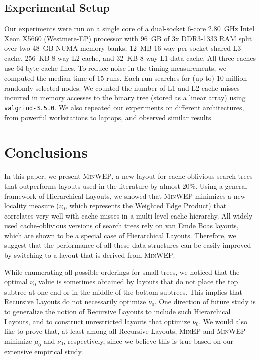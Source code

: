 \documentclass[10pt,conference,letterpaper]{IEEEtran}
\newcommand{\todo}[1]{}
\newcommand{\note}[1]{}
\newcommand{\vEBls}{van Emde Boas layouts\xspace}
\newcommand{\HL}{Hierarchical Layout\xspace}
\newcommand{\HLs}{Hierarchical Layouts\xspace}
\newcommand{\RLs}{Recursive Layouts\xspace}
\newcommand{\WEP}{Weighted Edge Product\xspace}
\newcommand{\pmean}[1][p]{\ensuremath{\mu_{#1}}\xspace}
\newcommand{\pwmean}[1][p]{\ensuremath{\nu_{#1}}\xspace}
\newcommand{\minep}{\textsc{MinEP}\xspace}
\newcommand{\minwep}{\textsc{MinWEP}\xspace}
\begin{document}
\subsection{Experimental Setup}
\label{sec:setup}

Our experiments were run on a single core of a
dual-socket 6-core 2.80~GHz Intel Xeon X5660 (Westmere-EP) processor with
96~GB of 3x DDR3-1333 RAM split over two 48~GB NUMA memory banks,
12~MB 16-way per-socket shared L3 cache,
256~KB 8-way L2 cache,
and 32~KB 8-way L1 data cache.
All three caches use 64-byte cache lines.
To reduce noise in the timing measurements, we computed the median time
of 15 runs.  Each run searches for (up to) 10 million randomly selected nodes.
We counted the number of L1 and L2 cache misses incurred in memory accesses
to the binary tree (stored as a linear array) using \texttt{valgrind-3.5.0}.
We also repeated our experiments on different architectures,
from powerful workstations to laptops, and observed similar results.

\todo{
Only search time exeriments here. since everything else has already been demonstrated?

No need to compare with DFS,etc, at this point. just i/p-VEB, and minWEP?

Cache Miss experiments.
Search time experiments. (Discuss trade-offs in calculation, compare with vEB.) 
}

\section{Conclusions}

In this paper, we present \minwep, a new layout for cache-oblivious search trees that outperforms layouts used in the literature by almost $20\%$. Using a general framework of \HLs, we showed that \minwep minimizes a new locality measure (\pwmean[0], which represents the \WEP) that correlates very well with cache-misses in a multi-level cache hierarchy. 
All widely used cache-oblivious versions of search trees rely on \vEBls, which are shown to be a special case of \HLs. Therefore, we suggest that the performance of all these data structures can be easily improved by switching to a layout that is derived from \minwep.

While enumerating all possible orderings for small trees, we noticed that the optimal \pwmean[0] value is sometimes obtained by layouts that do not place the top subtree at one end or in the middle of the bottom subtrees. This implies that \RLs do not necessarily optimize \pwmean[0]. One direction of future study is to generalize the notion of \RLs to include such \HLs, and to construct unrestricted layouts that optimize \pwmean[0]. We would also like to prove that, at least among all \RLs, \minep and \minwep minimize \pmean[0] and \pwmean[0], respectively, since we believe this is true based on our extensive empirical study.
\note{These seem like contradictory statements.  If \minwep is a \HL and we think it minimizes \pwmean[0], then we could not have noticed a better one. Agreed, changed the text.}
\end{document}
